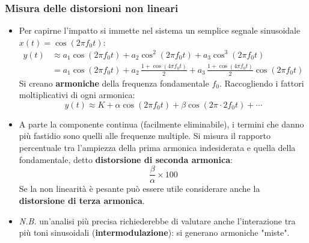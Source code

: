 \documentclass[12pt, a4paper]{article}
\begin{document}
\subsubsection{Misura delle distorsioni non lineari}
\begin{itemize}
    \item Per capirne l'impatto si immette nel sistema un semplice segnale sinusoidale $x(t)=\cos(2\pi f_0t)$:
    \begin{align*}
        y(t) &\approx a_1\cos(2\pi f_0t) + a_2\cos^2(2\pi f_0t) + a_3\cos^3(2\pi f_0t) \\
        &= a_1\cos(2\pi f_0t) + a_2\,\frac{1+\cos(4\pi f_0t)}{2} + a_3\,\frac{1+\cos(4\pi f_0t)}{2}\cos(2\pi f_0t)
    \end{align*}
    Si creano \textbf{armoniche} della frequenza fondamentale $f_0$. Raccogliendo i fattori moltiplicativi di ogni armonica:
    $$y(t) \approx K + \alpha\cos(2\pi f_0t) + \beta\cos(2\pi\cdot 2f_0t) + \cdots$$
    \item A parte la componente continua (facilmente eliminabile), i termini che danno più fastidio sono quelli alle frequenze multiple. Si misura il rapporto percentuale tra l'ampiezza della prima armonica indesiderata e quella della fondamentale, detto \textbf{distorsione di seconda armonica}:
    $$\frac{\beta}{\alpha}\times 100$$
    Se la non linearità è pesante può essere utile considerare anche la \textbf{distorsione di terza armonica}.
    \item[] \textit{N.B.} un'analisi più precisa richiederebbe di valutare anche l'interazione tra più toni sinusoidali (\textbf{intermodulazione}): si generano armoniche "miste".
\end{itemize}
\end{document}
